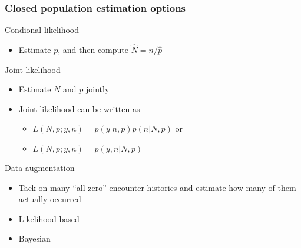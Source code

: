 \documentclass[color=usenames,dvipsnames]{beamer}\usepackage[]{graphicx}\usepackage[]{color}
\begin{document}
\begin{frame}
  \frametitle{Closed population estimation options}
  Condional likelihood \\
  \begin{itemize}
    \item Estimate $p$, and then compute $\hat{N}=n/\hat{p}$
  \end{itemize}
  \pause
  \vfill
  Joint likelihood \\
  \begin{itemize}
    \item Estimate $N$ and $p$ jointly
    \item Joint likelihood can be written as
      \begin{itemize}
      \item $L(N,p;y,n) = p(y|n,p)p(n|N,p)$ or
      \item $L(N,p;y,n) = p(y,n|N,p)$
      \end{itemize}
  \end{itemize}
  \pause \vfill
  Data augmentation \\
  \begin{itemize}
    \item Tack on many ``all zero'' encounter histories and estimate
      how many of them actually occurred
    \item Likelihood-based
    \item Bayesian
  \end{itemize}
\end{frame}
\end{document}
